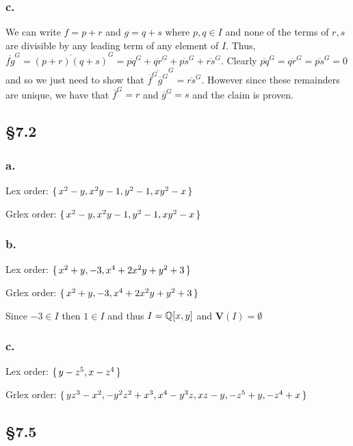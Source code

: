 \documentclass[letterpaper]{article}
\begin{document}
\subsubsection{c.}

We can write $f = p + r$ and $g = q + s$ where $p, q \in I$ and none of the terms of $r, s$ are divisible by any leading term of any element of $I$. Thus, $\overline{fg}^G = \overline{(p + r)(q + s)}^G = \overline{pq}^G + \overline{qr}^G + \overline{ps}^G + \overline{rs}^G$. Clearly $\overline{pq}^G = \overline{qr}^G = \overline{ps}^G = 0$ and so we just need to show that $ \overline{\overline{f}^G \overline{g}^G}^G = \overline{rs}^G$. However since these remainders are unique, we have that $\overline{f}^{G} = r$ and $\overline{g}^{G} = s$ and the claim is proven.

\subsection{\S 7.2}

\subsubsection{a.}

Lex order: $\set{x^{2} - y, x^{2} y - 1, y^{2} - 1, x y^{2} - x}$

Grlex order: $\set{x^{2} - y, x^{2} y - 1, y^{2} - 1, x y^{2} - x}$

\subsubsection{b.}

Lex order: $\set{x^{2} + y, -3, x^{4} + 2 x^{2} y + y^{2} + 3}$

Grlex order: $\set{x^{2} + y, -3, x^{4} + 2 x^{2} y + y^{2} + 3}$

Since $-3 \in I$ then $1 \in I$ and thus $I = \Q\bqty{x, y}$ and $\textbf{V}(I) = \emptyset$

\subsubsection{c.}

Lex order: $\set{y - z^{5}, x - z^{4}}$

Grlex order: $\set{y z^{3} - x^{2}, -y^{2} z^{2} + x^{3}, x^{4} - y^{3} z, x z - y, -z^{5} + y, -z^{4} + x}$

\subsection{\S 7.5}
\end{document}
